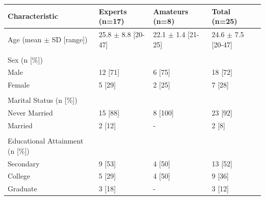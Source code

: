 		\begin{landscape}
			\begin{table} [!htbp]
				\centering
		         \label{tab:demographics} 
		   		\vspace{0.20cm}    
		        \begin{tabular}{|p{6cm}R{4cm}R{4cm}R{4cm}|} %
		        	\hline 

		       		\textbf{Characteristic} 					& \textbf{Experts (n=17)} 	& \textbf{Amateurs (n=8)} 	& \textbf{Total (n=25)} 		\\ \hline
		       		Age (mean $\pm$ SD [range]) 	& 25.8 $\pm$ 8.8 [20-47]		& 22.1 $\pm$ 1.4 [21-25] 	& 24.6 $\pm$ 7.5 [20-47] 	\\
		       															& 											& 											& 											\\
		       		Sex (n [\%])									& 											&											&											\\
		       			\hspace{6mm}Male 					& 12 [71] 								& 6 [75]								& 18 [72]								\\
		       			\hspace{6mm}Female 			& 5 [29]								& 2 [25]								& 7 [28]								\\
		       															& 											& 											& 											\\
		       		Marital Status (n [\%])					&											&											&											\\
		       			\hspace{6mm}Never Married 	& 15 [88]								& 8 [100]								& 23 [92]								\\
		       			\hspace{6mm}Married 			& 2 [12]								& - 										& 2 [8]									\\
		       															& 											& 											& 											\\
		       		Educational Attainment (n [\%]) 	&											&											&											\\
		       			\hspace{6mm}Secondary 		& 9 [53] 								& 4 [50]								& 13 [52] 								\\
		       			\hspace{6mm}College 			& 5 [29] 								& 4 [50]								& 9 [36]	 							\\
		       			\hspace{6mm}Graduate 			& 3 [18] 								& - 										& 3 [12] 								\\

\end{tabular}
\end{table}
\end{landscape}
